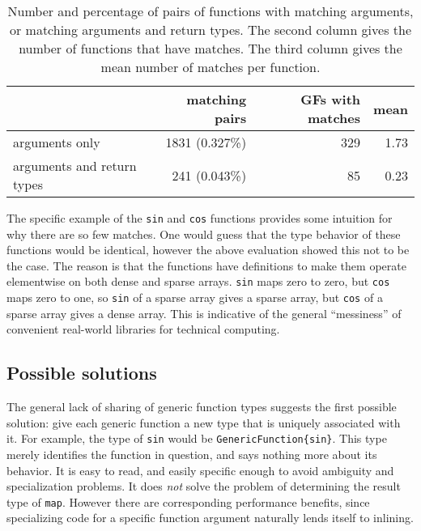 \begin{table}
  \begin{center}
    \begin{tabular}{|l|r|r|r|}\hline
    &  \textbf{matching pairs} & \textbf{GFs with matches} & \textbf{mean} \\
      \hline \hline
arguments only             & 1831 (0.327\%)  &   329       &          1.73 \\
\hline
arguments and return types &  241 (0.043\%)  &   85        &          0.23 \\
\hline
\end{tabular}
\end{center}
  \caption[Sharing of function types]{
\small{
    Number and percentage of pairs of functions with matching arguments, or
    matching arguments and return types. The second column gives the number of
    functions that have matches. The third column gives the
    mean number of matches per function.
}
  }
  \label{tab:matchingfuncs}
\end{table}

The specific example of the \texttt{sin} and \texttt{cos} functions provides
some intuition for why there are so few matches.
One would guess that the type behavior of these functions would be identical,
however the above evaluation showed this not to be the case.
The reason is that the functions have definitions to make them operate
elementwise on both dense and sparse arrays.
\texttt{sin} maps zero to zero, but \texttt{cos} maps zero to one,
so \texttt{sin} of a sparse array gives a sparse array, but
\texttt{cos} of a sparse array gives a dense array.
This is indicative of the general ``messiness'' of convenient real-world
libraries for technical computing.


\subsection{Possible solutions}

The general lack of sharing of generic function types suggests the first
possible solution: give each generic function a new type that is uniquely
associated with it. For example, the type of \texttt{sin} would be
\texttt{GenericFunction\{sin\}}. This type merely identifies the function
in question, and says nothing more about its behavior. It is easy to read,
and easily specific enough to avoid ambiguity and specialization
problems. It does \emph{not} solve the problem of
determining the result type of \texttt{map}. However there are
corresponding performance benefits, since specializing code for a
specific function argument naturally lends itself to inlining.

